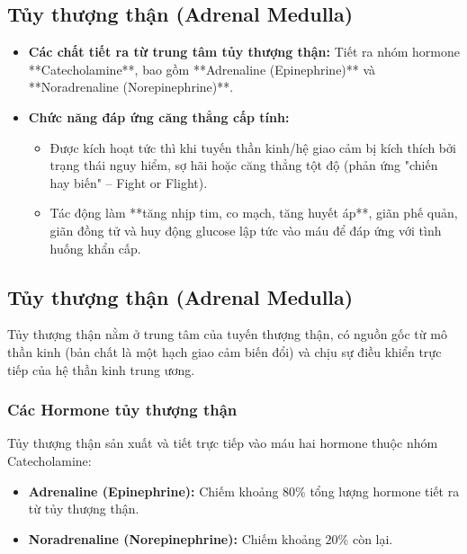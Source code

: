 \subsection{Tủy thượng thận (Adrenal Medulla)}

\begin{itemize}
    \item \textbf{Các chất tiết ra từ trung tâm tủy thượng thận:} Tiết ra nhóm hormone **Catecholamine**, bao gồm **Adrenaline (Epinephrine)** và **Noradrenaline (Norepinephrine)**.
    \item \textbf{Chức năng đáp ứng căng thẳng cấp tính:}
    \begin{itemize}
        \item Được kích hoạt tức thì khi tuyến thần kinh/hệ giao cảm bị kích thích bởi trạng thái nguy hiểm, sợ hãi hoặc căng thẳng tột độ (phản ứng "chiến hay biến" -- Fight or Flight).
        \item Tác động làm **tăng nhịp tim, co mạch, tăng huyết áp**, giãn phế quản, giãn đồng tử và huy động glucose lập tức vào máu để đáp ứng với tình huống khẩn cấp.
    \end{itemize}
\end{itemize}

\subsection{Tủy thượng thận (Adrenal Medulla)}

Tủy thượng thận nằm ở trung tâm của tuyến thượng thận, có nguồn gốc từ mô thần kinh (bản chất là một hạch giao cảm biến đổi) và chịu sự điều khiển trực tiếp của hệ thần kinh trung ương.

\subsubsection{Các Hormone tủy thượng thận}
Tủy thượng thận sản xuất và tiết trực tiếp vào máu hai hormone thuộc nhóm Catecholamine:
\begin{itemize}
    \item \textbf{Adrenaline (Epinephrine):} Chiếm khoảng $80\%$ tổng lượng hormone tiết ra từ tủy thượng thận.
    \item \textbf{Noradrenaline (Norepinephrine):} Chiếm khoảng $20\%$ còn lại.
\end{itemize}

